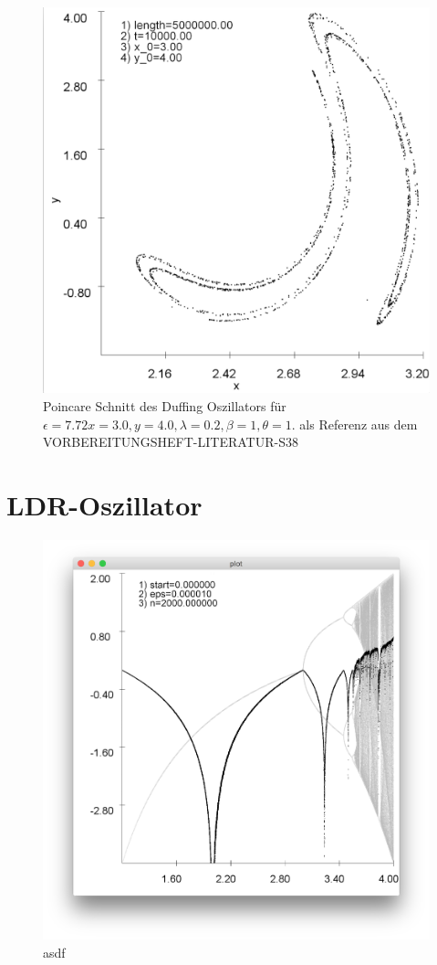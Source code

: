 \documentclass{scrartcl}
\begin{document}
\begin{figure}
	\centering
	\includegraphics[scale=0.20]{poincare-772}
	\caption{Poincare Schnitt des Duffing Oszillators für $\epsilon=7.72 x=3.0, y=4.0, \lambda=0.2, \beta=1, \theta=1$. als Referenz aus dem VORBEREITUNGSHEFT-LITERATUR-S38}
	\label{img:poincare-772}
\end{figure}
\section {LDR-Oszillator}



\begin{figure}
	\centering
	\includegraphics[scale=0.60]{lyapunov-log}
	\caption{asdf}
	\label{img:lyapunov-log}
\end{figure}
\end{document}
